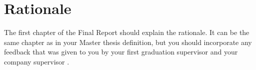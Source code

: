 \chapter{Rationale}\label{chap:rationale}
The first chapter of the Final Report should explain the rationale. It can be the same chapter as in your Master thesis definition, but you should incorporate any feedback that was given to you by your first graduation supervisor and your company supervisor \cite{jenelten2023dtc}.
